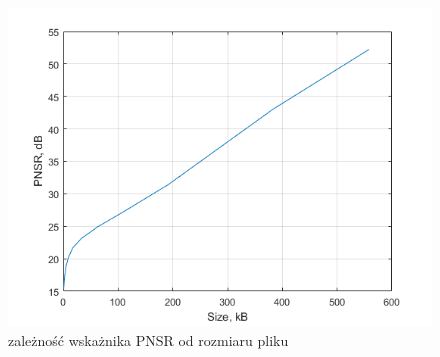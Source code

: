 \documentclass{report}
\begin{document}
\renewcommand{\ww}{0.5}
\begin{figure}

    \includegraphics[]{../matlab/size_pnsr_jp2.png   }
    \centering

    \caption{zależność wskażnika PNSR od rozmiaru pliku} %
    \label{fig:fig1}
\end{figure}
\end{document}
